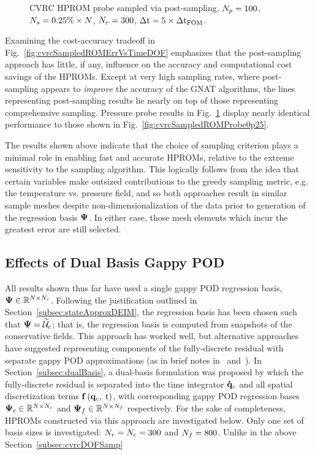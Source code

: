 \begin{figure}
\begin{minipage}{0.49\linewidth}
		\caption{\label{fig:cvrcSampledROMProbesDOF}CVRC HPROM probe sampled via post-sampling, $N_p = 100$, $N_s = 0.25\% \times N$, $N_r = 300$, $\Delta \text{t} = 5 \times \Delta \text{t}_{\text{FOM}}$.}
	\end{minipage}
\end{figure}

Examining the cost-accuracy tradeoff in Fig.~\ref{fig:cvrcSampledROMErrVsTimeDOF} emphasizes that the post-sampling approach has little, if any, influence on the accuracy and computational cost savings of the HPROMs. Except at very high sampling rates, where post-sampling appears to \textit{improve} the accuracy of the GNAT algorithms, the lines representing post-sampling results lie nearly on top of those representing comprehensive sampling. Pressure probe results in Fig.~\ref{fig:cvrcSampledROMProbesDOF} display nearly identical performance to those shown in Fig.~\ref{fig:cvrcSampledROMProbe0p25}.

The results shown above indicate that the choice of sampling criterion plays a minimal role in enabling fast and accurate HPROMs, relative to the extreme sensitivity to the sampling algorithm. This logically follows from the idea that certain variables make outsized contributions to the greedy sampling metric, e.g. the temperature vs. pressure field, and so both approaches result in similar sample meshes despite non-dimensionalization of the data prior to generation of the regression basis $\deimBasis$. In either case, those mesh elements which incur the greatest error are still selected.

\subsection{Effects of Dual Basis Gappy POD}\label{subsec:cvrcDualBasis}

All results shown thus far have used a single gappy POD regression basis, $\deimBasis \inRTwo{\numDOF}{\numResModes}$. Following the justification outlined in Section~\ref{subsec:stateApproxDEIM}, the regression basis has been chosen such that $\deimBasis = \consTrialSpace$; that is, the regression basis is computed from snapshots of the conservative fields. This approach has worked well, but alternative approaches have suggested representing components of the fully-discrete residual with separate gappy POD approximations (as in brief notes in~\cite{Tezaur2017} and~\cite{Grimberg2021}). In Section~\ref{subsec:dualBasis}, a dual-basis formulation was proposed by which the fully-discrete residual is separated into the time integrator $\accentset{\mbox{\large\bfseries .}}{\mathbf{q}}_{c}$ and all spatial discretization terms $\mathbf{f} \left(\mathbf{q}_{c}, \; \text{t}\right)$, with corresponding gappy POD regression bases $\deimBasisCons \inRTwo{\numDOF}{\numConsModes}$ and $\deimBasisRhs \inRTwo{\numDOF}{\numRHSModes}$ respectively. For the sake of completeness, HPROMs constructed via this approach are investigated below. Only one set of basis sizes is investigated: $N_r = N_c = 300$ and $N_f = 800$. Unlike in the above Section~\ref{subsec:cvrcDOFSamp}

